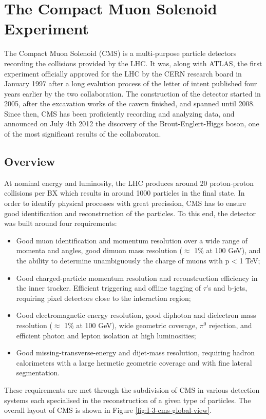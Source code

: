 \chapter{The Compact Muon Solenoid Experiment}
\label{chap:I-3-cms}

	The Compact Muon Solenoid (CMS) \cite{1748-0221-3-08-S08004} is a multi-purpose particle detectors recording the collisions provided by the LHC. It was, along with ATLAS, the first experiment officially approved for the LHC by the CERN research board in January 1997 after a long evalution process of the letter of intent published four years earlier by the two collaboration. The construction of the detector started in 2005, after the excavation works of the cavern finished, and spanned until 2008. Since then, CMS has been proficiently recording and analyzing data, and announced on July 4th 2012 the discovery of the Brout-Englert-Higgs boson, one of the most significant results of the collaboraton.

  \section{Overview}

    At nominal energy and luminosity, the LHC produces around 20 proton-proton collisions per BX which results in around 1000 particles in the final state. In order to identify physical processes with great precission, CMS has to ensure good identification and reconstruction of the particles. To this end, the detector was built around four requirements:
    \begin{itemize}
      \item Good muon identification and momentum resolution over a wide range of momenta and angles, good dimuon mass resolution ($ \approx $ 1\% at 100 GeV), and the ability to determine unambiguously the charge of muons with p < 1 TeV;
      \item Good charged-particle momentum resolution and reconstruction efficiency in the inner tracker. Efficient triggering and offline tagging of $ \tau $'s and b-jets, requiring pixel detectors close to the interaction region;
      \item Good electromagnetic energy resolution, good diphoton and dielectron mass resolution ($ \approx $ 1\% at 100 GeV), wide geometric coverage, $ \pi^0 $ rejection, and efficient photon and lepton isolation at high luminosities;
      \item Good missing-transverse-energy and dijet-mass resolution, requiring hadron calorimeters with a large hermetic geometric coverage and with fine lateral segmentation.
    \end{itemize}
    These requirements are met through the subdivision of CMS in various detection systems each specialised in the reconstruction of a given type of particles. The overall layout of CMS is shown in Figure \ref{fig:I-3-cms-global-view}. \\


